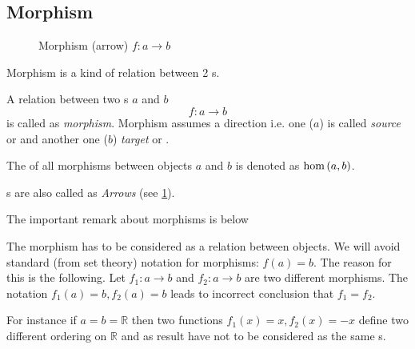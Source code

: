 \subsection{Morphism}

\begin{figure}
  \centering
  \caption{Morphism (arrow) $f: a \to b $}
  \label{fig:morphism}
\end{figure}


Morphism is a kind of relation between 2 s. 
\begin{definition}[Morphism]
  \label{def:morphism}
  A relation between two s $a$ and $b$ 
  \[
  f: a \rightarrow b
  \]
  is called as \textit{morphism}. Morphism assumes a direction i.e. one
  ($a$) is called \textit{source} or  and another one ($b$)
  \textit{target} or .

  The  of all morphisms between objects $a$ and $b$
  is denoted as $\catmset{a}{b}$.
\end{definition}

\begin{definition}[Arrow]
  \label{def:arrow}
  s are also called as \textit{Arrows} (see
  \cref{fig:morphism}). 
\end{definition}

The important remark about morphisms is below
\begin{remark}[Morphism]
\label{rem:morphism}
The morphism has to be considered as a relation between objects. We
will avoid standard (from set theory) notation for morphisms: $f(a) =
b$. The reason for this is the following. Let $f_1: a \to b$ and $f_2:
a \to b$ are two different morphisms. The notation $f_1(a) = b, f_2(a) =
b$ leads to incorrect conclusion that $f_1 = f_2$. 

For instance if $a
= b = \mathbb{R}$ then two functions $f_1(x) = x, f_2(x) = -x$ define two
different ordering on $\mathbb{R}$ and as result have not to be
considered as the same s.
\end{remark}

